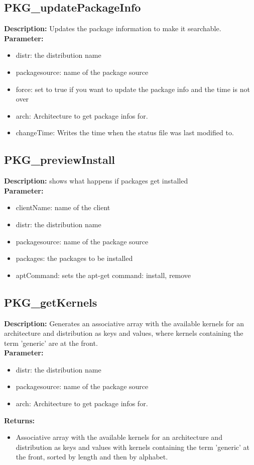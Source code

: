 \subsection{PKG\_updatePackageInfo}
\textbf{Description:} Updates the package information to make it searchable.\\
\textbf{Parameter:}
\begin{itemize}
\item distr: the distribution name
\item packagesource: name of the package source
\item force: set to true if you want to update the package info and the time is not over
\item arch: Architecture to get package infos for.
\item changeTime: Writes the time when the status file was last modified to.
\end{itemize}

\subsection{PKG\_previewInstall}
\textbf{Description:} shows what happens if packages get installed\\
\textbf{Parameter:}
\begin{itemize}
\item clientName: name of the client
\item distr: the distribution name
\item packagesource: name of the package source
\item packages: the packages to be installed
\item aptCommand: sets the apt-get command: install, remove
\end{itemize}

\subsection{PKG\_getKernels}
\textbf{Description:} Generates an associative array with the available kernels for an architecture and distribution as keys and values, where kernels containing the term 'generic' are at the front.\\
\textbf{Parameter:}
\begin{itemize}
\item distr: the distribution name
\item packagesource: name of the package source
\item arch: Architecture to get package infos for.
\end{itemize}
\textbf{Returns:}
\begin{itemize}
\item Associative array with the available kernels for an architecture and distribution as keys and values with kernels containing the term 'generic' at the front, sorted by length and then by alphabet.
\end{itemize}

